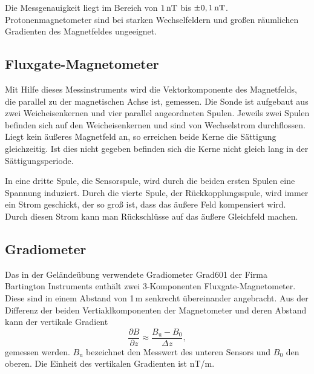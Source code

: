 Die Messgenauigkeit liegt im Bereich von $1\,\mathrm{nT}$ bis $\pm0,1\,\mathrm{nT}$. Protonenmagnetometer sind bei starken Wechselfeldern und großen räumlichen Gradienten des Magnetfeldes ungeeignet.

\subsection{Fluxgate-Magnetometer}
Mit Hilfe dieses Messinstruments wird die Vektorkomponente des Magnetfelds, die parallel zu der magnetischen Achse ist, gemessen.
Die Sonde ist aufgebaut aus zwei Weicheisenkernen und vier parallel angeordneten Spulen. Jeweils zwei Spulen befinden sich auf den Weicheisenkernen und sind 
von Wechselstrom durchflossen. Liegt kein äußeres Magnetfeld an, so erreichen beide Kerne die Sättigung gleichzeitig. Ist dies nicht gegeben befinden sich 
die Kerne nicht gleich lang in der Sättigungsperiode.

In eine dritte Spule, die Sensorspule, wird durch die beiden ersten Spulen eine Spannung induziert. Durch die vierte Spule, der Rückkopplungsspule, wird immer
ein Strom geschickt, der so groß ist, dass das äußere Feld kompensiert wird. Durch diesen Strom kann man Rückschlüsse auf das äußere Gleichfeld machen. 

\subsection{Gradiometer}
Das in der Geländeübung verwendete Gradiometer Grad601 der Firma Bartington Instruments enthält zwei 3-Komponenten Fluxgate-Magnetometer. Diese sind in einem 
Abstand von 1\,m senkrecht übereinander angebracht.
Aus der Differenz der beiden Vertiaklkomponenten der Magnetometer und deren Abstand kann der vertikale Gradient
\begin{equation}
 \frac{\partial B}{\partial z} \approx  \frac{B_{\mathrm{u}}-B_0}{\Delta z} \comma
\end{equation}
gemessen werden. $B_{\mathrm{u}}$ bezeichnet den Messwert des unteren Sensors und $B_0$ den oberen. Die Einheit des vertikalen Gradienten ist nT/m.





